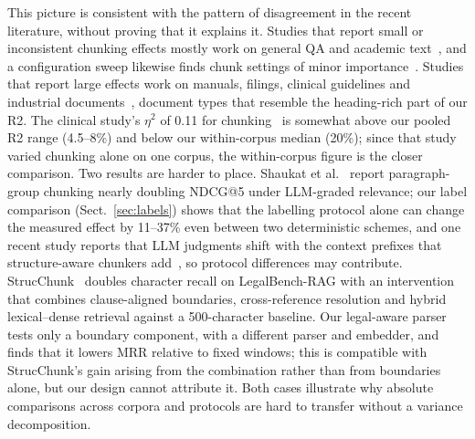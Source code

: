 \documentclass[runningheads]{llncs}
\begin{document}
This picture is consistent with the pattern of disagreement in the recent literature, without proving that it explains it. Studies that report small or inconsistent chunking effects mostly work on general QA and academic text~\cite{bennani2026systematic,caspari2026complex,kreileder2026academic}, and a configuration sweep likewise finds chunk settings of minor importance~\cite{li2025enhancing}. Studies that report large effects work on manuals, filings, clinical guidelines and industrial documents~\cite{taiwo2026oilgas,gomezcabello2025clinical,demoura2026adaptive,jimenoyepes2024financial}, document types that resemble the heading-rich part of our R2. The clinical study's $\eta^2$ of 0.11 for chunking~\cite{gomezcabello2025clinical} is somewhat above our pooled R2 range (4.5--8\%) and below our within-corpus median (20\%); since that study varied chunking alone on one corpus, the within-corpus figure is the closer comparison. Two results are harder to place. Shaukat et al.~\cite{shaukat2026systematic} report paragraph-group chunking nearly doubling NDCG@5 under LLM-graded relevance; our label comparison (Sect.~\ref{sec:labels}) shows that the labelling protocol alone can change the measured effect by 11--37\% even between two deterministic schemes, and one recent study reports that LLM judgments shift with the context prefixes that structure-aware chunkers add~\cite{yang2026titlechain}, so protocol differences may contribute. StrucChunk~\cite{singh2026strucchunk} doubles character recall on LegalBench-RAG with an intervention that combines clause-aligned boundaries, cross-reference resolution and hybrid lexical--dense retrieval against a 500-character baseline. Our legal-aware parser tests only a boundary component, with a different parser and embedder, and finds that it lowers MRR relative to fixed windows; this is compatible with StrucChunk's gain arising from the combination rather than from boundaries alone, but our design cannot attribute it. Both cases illustrate why absolute comparisons across corpora and protocols are hard to transfer without a variance decomposition.
\end{document}
